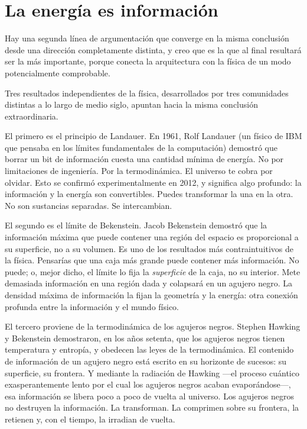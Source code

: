 \documentclass[11pt, twoside, openright]{book}
\begin{document}
\section*{La energía es información}

Hay una segunda línea de argumentación que converge en la misma conclusión desde una dirección completamente distinta, y creo que es la que al final resultará ser la más importante, porque conecta la arquitectura con la física de un modo potencialmente comprobable.

Tres resultados independientes de la física, desarrollados por tres comunidades distintas a lo largo de medio siglo, apuntan hacia la misma conclusión extraordinaria.

El primero es el principio de Landauer. En 1961, Rolf Landauer (un físico de IBM que pensaba en los límites fundamentales de la computación) demostró que borrar un bit de información cuesta una cantidad mínima de energía. No por limitaciones de ingeniería. Por la termodinámica. El universo te cobra por olvidar. Esto se confirmó experimentalmente en 2012, y significa algo profundo: la información y la energía son convertibles. Puedes transformar la una en la otra. No son sustancias separadas. Se intercambian.

El segundo es el límite de Bekenstein. Jacob Bekenstein demostró que la información máxima que puede contener una región del espacio es proporcional a su superficie, no a su volumen. Es uno de los resultados más contraintuitivos de la física. Pensarías que una caja más grande puede contener más información. No puede; o, mejor dicho, el límite lo fija la \textit{superficie} de la caja, no su interior. Mete demasiada información en una región dada y colapsará en un agujero negro. La densidad máxima de información la fijan la geometría y la energía: otra conexión profunda entre la información y el mundo físico.

El tercero proviene de la termodinámica de los agujeros negros. Stephen Hawking y Bekenstein demostraron, en los años setenta, que los agujeros negros tienen temperatura y entropía, y obedecen las leyes de la termodinámica. El contenido de información de un agujero negro está escrito en su horizonte de sucesos: su superficie, su frontera. Y mediante la radiación de Hawking ---el proceso cuántico exasperantemente lento por el cual los agujeros negros acaban evaporándose---, esa información se libera poco a poco de vuelta al universo. Los agujeros negros no destruyen la información. La transforman. La comprimen sobre su frontera, la retienen y, con el tiempo, la irradian de vuelta.
\end{document}
